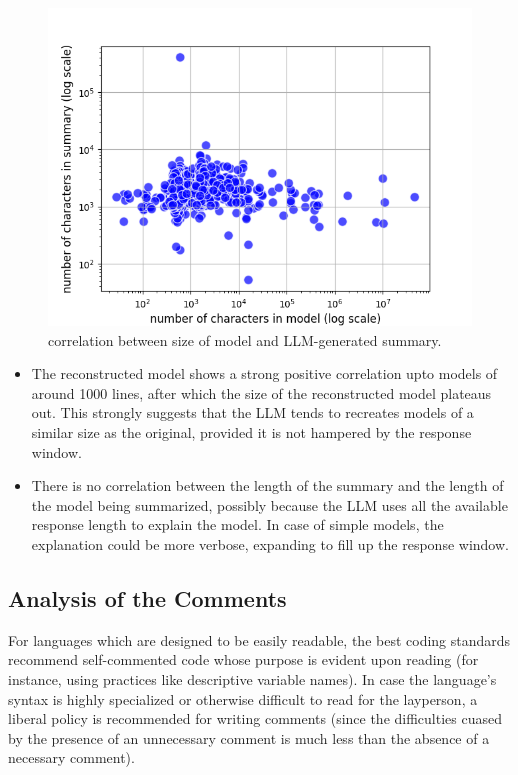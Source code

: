 \documentclass[conference]{IEEEtran}
\begin{document}
        
        \begin{figure}[htbp]
        \centerline{\includegraphics[width=\linewidth]{"./correlation between size of model and LLM-generated summary.png"}}
        \caption{correlation between size of model and LLM-generated summary.}
        \label{fig}
        \end{figure}

        
\begin{itemize}
\item The reconstructed model shows a strong positive correlation upto models of around 1000 lines, after which the size of the reconstructed model plateaus out. This strongly suggests that the LLM tends to recreates models of a similar size as the original, provided it is not hampered by the response window.
\item There is no correlation between the length of the summary and the length of the model being summarized, possibly because the LLM uses all the available response length to explain the model. In case of simple models, the explanation could be more verbose, expanding to fill up the response window.
\end{itemize}

\subsection{Analysis of the Comments}

For languages which are designed to be easily readable, the best coding standards recommend self-commented code whose purpose is evident upon reading (for instance, using practices like descriptive variable names). In case the language's syntax is highly specialized or otherwise difficult to read for the layperson, a liberal policy is recommended for writing comments (since the difficulties cuased by the presence of an unnecessary comment is much less than the absence of a necessary comment).
\end{document}

